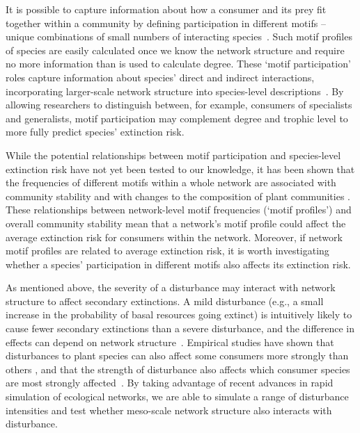 \documentclass[12pt]{article}
\begin{document}
\begin{spacing}{2.0}
    It is possible to capture information about how a consumer and its prey fit together within a community by defining participation in different motifs -- unique combinations of small numbers of interacting species~\citep{Stouffer2007,Stouffer2012}. 
    Such motif profiles of species are easily calculated once we know the network structure and require no more information than is used to calculate degree.
    These `motif participation' roles capture information about species' direct and indirect interactions, incorporating larger-scale network structure into species-level descriptions~\citep{Cirtwill2015a,Cirtwill2018FoodWebs}. 
    By allowing researchers to distinguish between, for example, consumers of specialists and generalists, motif participation may complement degree and trophic level to more fully predict species' extinction risk. 
    

    While the potential relationships between motif participation and species-level extinction risk have not yet been tested to our knowledge, it has been shown that the frequencies of different motifs within a whole network are associated with community stability \citep{prill2005dynamic, bascompte2005simple} and with changes to the composition of plant communities \citep{giling2019plant}. 
    These relationships between network-level motif frequencies (`motif profiles') and overall community stability mean that a network's motif profile could affect the average extinction risk for consumers within the network.
    Moreover, if network motif profiles are related to average extinction risk, it is worth investigating whether a species' participation in different motifs also affects its extinction risk.


    As mentioned above, the severity of a disturbance may interact with network structure to affect secondary extinctions.
    A mild disturbance (e.g., a small increase in the probability of basal resources going extinct) is intuitively likely to cause fewer secondary extinctions than a severe disturbance, and the difference in effects can depend on network structure~\citep{Baumgartner2015}.
    Empirical studies have shown that disturbances to plant species can also affect some consumers more strongly than others  \citep{byrnes2011climate}, and that the strength of disturbance also affects which consumer species are most strongly affected~\citep{detmer2021variation,carnell2020more}. 
    By taking advantage of recent advances in rapid simulation of ecological networks, we are able to simulate a range of disturbance intensities and test whether meso-scale network structure also interacts with disturbance.
    

\end{spacing}
\end{document}
